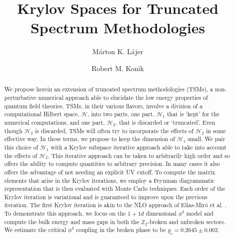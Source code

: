 \documentclass[twocolumn,secnumarabic,amssymb, nobibnotes, aps, prd]{revtex4-2}
\begin{document}
\title{Krylov Spaces for Truncated Spectrum Methodologies}%


\author{M\'arton K. L\'ajer}
\author{Robert  M. Konik}


\begin{abstract}

We propose herein an extension of truncated spectrum methodologies (TSMs), a non-perturbative numerical approach able to elucidate the low energy properties of quantum field theories.  TSMs, in their various flavors, involve a division of a computational Hilbert space, $\mathcal{H}$, into two parts, one part, $\mathcal{H}_1$ that is `kept' for the numerical computations, and one part, $\mathcal{H}_2$, that is discarded or `truncated'.  Even though $\mathcal{H}_2$ is discarded, TSMs will often try to incorporate the effects of $\mathcal{H}_2$ in some effective way.  In these terms, we propose to keep the dimension of $\mathcal{H}_1$ small.  We pair this choice of $\mathcal{H}_1$ with a Krylov subspace iterative approach able to take into account the effects of $\mathcal{H}_2$.  This iterative approach can be taken to arbitrarily high order and so offers the ability to compute quantities to arbitrary precision.  
In many cases it also offers the advantage of not needing an explicit UV cutoff.
To compute the matrix elements that arise in the Krylov iterations, we employ a Feynman diagrammatic representation that is then evaluated with Monte Carlo techniques.  Each order of the Krylov iteration is variational and is guaranteed to improve upon the previous iteration.  The first Krylov iteration is akin to the NLO approach of Elias-Miró et al. \cite{Elias-Miro:2017tup}.
To demonstrate this approach, we focus on the $1+1d$ dimensional $\phi^4$ model and compute the bulk energy and mass gaps in both the $\mathbb{Z}_2$-broken and unbroken sectors.  We estimate the critical $\phi^4$ coupling in the broken phase to be $g_c=0.2645\pm0.002$.

\end{abstract}

\maketitle
\end{document}
